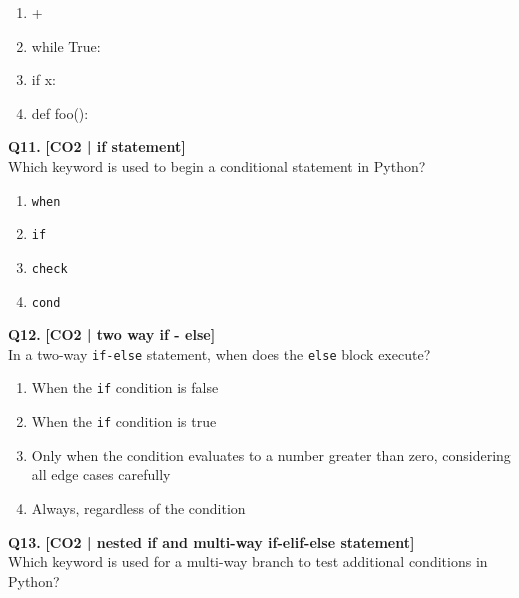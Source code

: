\begin{enumerate}[label=(\alph*),topsep=2pt,itemsep=1pt,partopsep=0pt,parsep=0pt]
    \item {} +
    \item \relax while True:
    \item \relax if x:
    \item \relax def foo():
\end{enumerate}
\vspace{{2mm}}

\noindent\textbf{Q11.} \hfill {\small\color{LPUOrange}\textbf{[CO2 | if statement]}}\\[2pt]
Which keyword is used to begin a conditional statement in Python?

\begin{enumerate}[label=(\alph*),topsep=2pt,itemsep=1pt,partopsep=0pt,parsep=0pt]
    \item \relax \texttt{when}
    \item \relax \texttt{if}
    \item \relax \texttt{check}
    \item \relax \texttt{cond}
\end{enumerate}
\vspace{{2mm}}

\noindent\textbf{Q12.} \hfill {\small\color{LPUOrange}\textbf{[CO2 | two way if - else]}}\\[2pt]
In a two-way \texttt{if-else} statement, when does the \texttt{else} block execute?

\begin{enumerate}[label=(\alph*),topsep=2pt,itemsep=1pt,partopsep=0pt,parsep=0pt]
    \item \relax When the \texttt{if} condition is false
    \item \relax When the \texttt{if} condition is true
    \item \relax Only when the condition evaluates to a number greater than zero, considering all edge cases carefully
    \item \relax Always, regardless of the condition
\end{enumerate}
\vspace{{2mm}}

\noindent\textbf{Q13.} \hfill {\small\color{LPUOrange}\textbf{[CO2 | nested if and multi-way if-elif-else statement]}}\\[2pt]
Which keyword is used for a multi-way branch to test additional conditions in Python?

